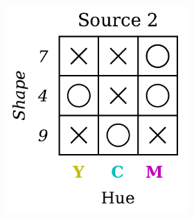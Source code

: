 \begin{dataset}
\begin{figure}[H]
\begin{subfigure}[b]{0.45\textwidth}
\begin{subfigure}[b]{0.48\textwidth}
                \includegraphics[width=\textwidth]{img/datasets/2-CGO_fact=hue_env=1.pdf}
            \end{subfigure}
        \end{subfigure}
        \hfill
        \begin{subfigure}[b]{0.45\textwidth}
            \centering
            \begin{subfigure}[b]{0.48\textwidth}
                \centering

\end{subfigure}
\end{subfigure}
\end{figure}
\end{dataset}
